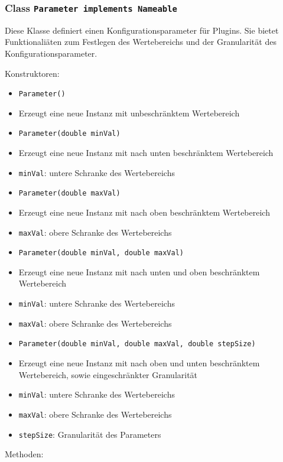 \documentclass[parskip=full,11pt]{scrartcl}
\begin{document}
\subsubsection{Class \texttt{Parameter implements Nameable}}

Diese Klasse definiert einen Konfigurationsparameter für Plugins. Sie bietet Funktionaliäten zum Festlegen des Wertebereichs und der Granularität des Konfigurationsparameter.

Konstruktoren:
\begin{itemize}\itemsep -10pt
	\item \texttt{Parameter()}
	\item[] Erzeugt eine neue Instanz mit unbeschränktem Wertebereich 
	\item \texttt{Parameter(double minVal)}
	\item[] Erzeugt eine neue Instanz mit nach unten beschränktem Wertebereich
	\item[] \texttt{minVal}: untere Schranke des Wertebereichs
	\item \texttt{Parameter(double maxVal)}
	\item[] Erzeugt eine neue Instanz mit nach oben beschränktem Wertebereich
	\item[] \texttt{maxVal}: obere Schranke des Wertebereichs
	\item \texttt{Parameter(double minVal, double maxVal)}
	\item[] Erzeugt eine neue Instanz mit nach unten und oben beschränktem Wertebereich
	\item[] \texttt{minVal}: untere Schranke des Wertebereichs
	\item[] \texttt{maxVal}: obere Schranke des Wertebereichs
	\item \texttt{Parameter(double minVal, double maxVal, double stepSize)}
	\item[] Erzeugt eine neue Instanz mit nach oben und unten beschränktem Wertebereich, sowie eingeschränkter Granularität
	\item[] \texttt{minVal}: untere Schranke des Wertebereichs
	\item[] \texttt{maxVal}: obere Schranke des Wertebereichs
	\item[] \texttt{stepSize}: Granularität des Parameters
	
\end{itemize}

Methoden:
\end{document}
